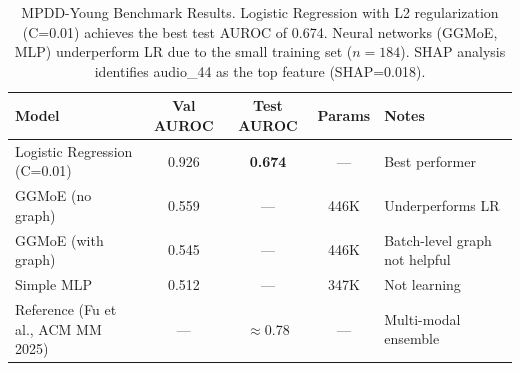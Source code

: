\begin{table}[htbp]
\centering
\caption{MPDD-Young Benchmark Results. Logistic Regression with L2 regularization (C=0.01) achieves the best test AUROC of 0.674. Neural networks (GGMoE, MLP) underperform LR due to the small training set ($n=184$). SHAP analysis identifies audio\_44 as the top feature (SHAP=0.018).}
\label{tab:mpdd_results}
\begin{tabular}{lcccp{4.5cm}}
\toprule
\textbf{Model} & \textbf{Val AUROC} & \textbf{Test AUROC} & \textbf{Params} & \textbf{Notes} \\
\midrule
Logistic Regression (C=0.01) & 0.926 & \textbf{0.674} & — & Best performer \\
GGMoE (no graph) & 0.559 & — & 446K & Underperforms LR \\
GGMoE (with graph) & 0.545 & — & 446K & Batch-level graph not helpful \\
Simple MLP & 0.512 & — & 347K & Not learning \\
\midrule
Reference (Fu et al., ACM MM 2025) & — & $\approx$0.78 & — & Multi-modal ensemble \\
\bottomrule
\end{tabular}
\end{table}